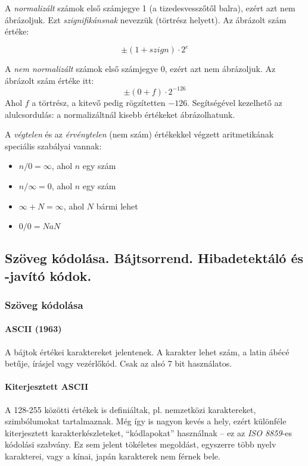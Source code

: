 \documentclass[10pt]{article}
\begin{document}
A \emph{normalizált} számok első számjegye 1 (a tizedesvesszőtől balra), ezért azt nem ábrázoljuk. Ezt \emph{szignifikánsnak} nevezzük (törtrész helyett). Az ábrázolt szám értéke:

$$\pm (1 + szign) \cdot 2^{e}$$

A \emph{nem normalizált} számok első számjegye 0, ezért azt nem ábrázoljuk. Az ábrázolt szám értéke itt:
$$\pm (0 + f) \cdot 2^{-126}$$
Ahol $f$ a törtrész, a kitevő pedig rögzítetten $-126$. Segítségével kezelhető az alulcsordulás: a normalizáltnál kisebb értékeket ábrázolhatunk.

A \emph{végtelen} és az \emph{érvénytelen} (nem szám) értékekkel végzett aritmetikának speciális szabályai vannak:
\begin{itemize}
	\item $n/0=\infty$, ahol $n$ egy szám
	\item $n/\infty=0$, ahol $n$ egy szám
	\item $\infty + N=\infty$, ahol $N$ bármi lehet
	\item $0/0=NaN$
\end{itemize}

\subsection{Szöveg kódolása. Bájtsorrend. Hibadetektáló és -javító kódok.}

\subsubsection{Szöveg kódolása}

\paragraph{ASCII (1963)} A bájtok értékei karaktereket jelentenek. A karakter lehet szám, a latin ábécé betűje, írásjel vagy vezérlőkód. Csak az alsó 7 bit használatos.

\paragraph{Kiterjesztett ASCII} A 128-255 közötti értékek is definiáltak, pl. nemzetközi karaktereket, szimbólumokat tartalmaznak. Még így is nagyon kevés a hely, ezért különféle kiterjesztett karakterkészleteket, ``kódlapokat'' használnak -- ez az \emph{ISO 8859}-es kódolási szabvány. Ez sem jelent tökéletes megoldást, egyszerre több nyelv karakterei, vagy a kínai, japán karakterek nem férnek bele.
\end{document}
